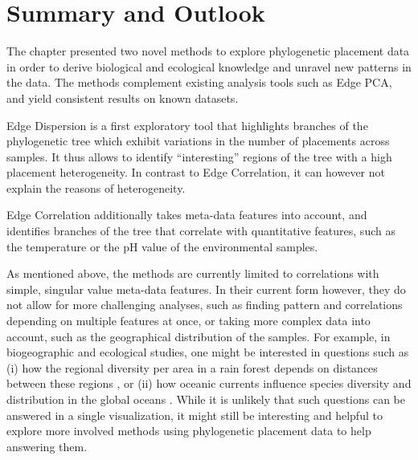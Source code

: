 
\section{Summary and Outlook}
\label{ch:Visualization:sec:SummaryOutlook}


The chapter presented two novel methods to explore phylogenetic placement data
in order to derive biological and ecological knowledge and unravel new patterns in the data.
The methods complement existing analysis tools such as Edge PCA,
and yield consistent results on known datasets.

Edge Dispersion is a first exploratory tool that highlights branches of the phylogenetic tree
which exhibit variations in the number of placements across samples.
It thus allows to identify ``interesting'' regions of the tree with a high placement heterogeneity.
In contrast to Edge Correlation, it can however not explain the reasons of heterogeneity.

Edge Correlation additionally takes meta-data features into account,
and identifies branches of the tree that correlate with quantitative features,
such as the temperature or the pH value of the environmental samples.


As mentioned above, the methods are currently limited to correlations with simple, singular value meta-data features.
In their current form however, they do not allow for more challenging analyses,
such as finding pattern and correlations depending on multiple features at once,
or taking more complex data into account, such as the geographical distribution of the samples.
For example, in biogeographic and ecological studies, one might be interested in questions such as
(i) how the regional diversity per area in a rain forest depends on distances between these regions \cite{Lentendu2018},
or (ii) how oceanic currents influence species diversity and distribution in the global oceans \cite{Sunagawa2015}.
While it is unlikely that such questions can be answered in a single visualization,
it might still be interesting and helpful to explore more involved methods
using phylogenetic placement data to help answering them.

